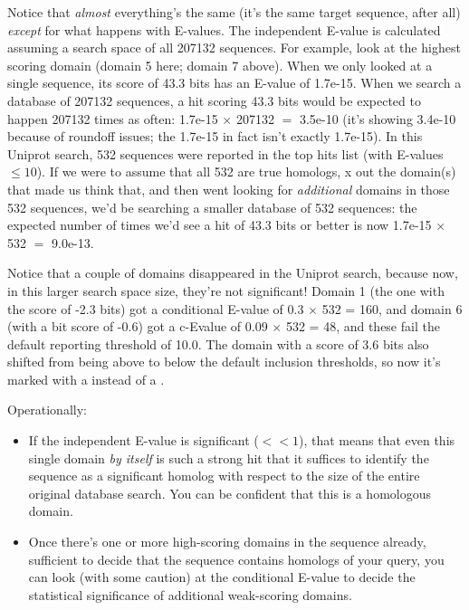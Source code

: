 Notice that \emph{almost} everything's the same (it's the same target
sequence, after all) \emph{except} for what happens with E-values. The
independent E-value is calculated assuming a search space of all
207132 sequences. For example, look at the highest scoring domain
(domain 5 here; domain 7 above). When we only looked at a single
sequence, its score of 43.3 bits has an E-value of 1.7e-15. When we
search a database of 207132 sequences, a hit scoring 43.3 bits would
be expected to happen 207132 times as often: 1.7e-15 $\times$ 207132
$=$ 3.5e-10 (it's showing 3.4e-10 because of roundoff issues; the
1.7e-15 in fact isn't exactly 1.7e-15). In this Uniprot search, 532
sequences were reported in the top hits list (with E-values $\leq
10$). If we were to assume that all 532 are true homologs, x out the
domain(s) that made us think that, and then went looking for
\emph{additional} domains in those 532 sequences, we'd be searching a
smaller database of 532 sequences: the expected number of times we'd
see a hit of 43.3 bits or better is now 1.7e-15 $\times$ 532 $=$
9.0e-13.

Notice that a couple of domains disappeared in the Uniprot search,
because now, in this larger search space size, they're not
significant! Domain 1 (the one with the score of -2.3 bits) got a
conditional E-value of 0.3 $\times$ 532 = 160, and domain 6 (with a
bit score of -0.6) got a c-Evalue of 0.09 $\times$ 532 = 48, and these
fail the default reporting threshold of 10.0. The domain with a score
of 3.6 bits also shifted from being above to below the default
inclusion thresholds, so now it's marked with a  instead of a
\ccode{!}.

Operationally:

\begin{itemize}
\item If the independent E-value is significant ($<<1$), that means
that even this single domain \emph{by itself} is such a strong hit
that it suffices to identify the sequence as a significant homolog
with respect to the size of the entire original database search. You
can be confident that this is a homologous domain.

\item Once there's one or more high-scoring domains in the sequence
already, sufficient to decide that the sequence contains homologs of
your query, you can look (with some caution) at the conditional
E-value to decide the statistical significance of additional
weak-scoring domains.
\end{itemize}

